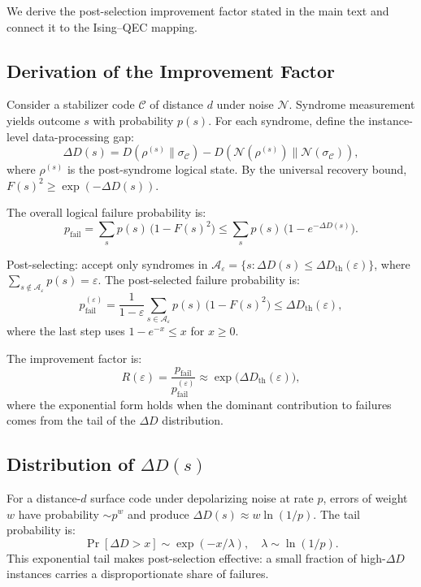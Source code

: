 \documentclass[prl,twocolumn,superscriptaddress,longbibliography]{revtex4-2}
\newcommand{\chan}{\mathcal{N}}
\newcommand{\code}{\mathcal{C}}
\begin{document}
We derive the post-selection improvement factor stated in the main text
and connect it to the Ising--QEC mapping.

\subsection{Derivation of the Improvement Factor}

Consider a stabilizer code $\code$ of distance $d$ under noise
$\chan$. Syndrome measurement yields outcome $s$ with probability
$p(s)$. For each syndrome, define the instance-level data-processing gap:
\begin{equation}
\Delta D(s) = D(\rho^{(s)}\|\sigma_\code)
  - D(\chan(\rho^{(s)})\|\chan(\sigma_\code)),
\end{equation}
where $\rho^{(s)}$ is the post-syndrome logical state. By the
universal recovery bound, $F(s)^2 \geq \exp(-\Delta D(s))$.

The overall logical failure probability is:
\begin{equation}
p_{\mathrm{fail}} = \sum_s p(s)\, \big(1 - F(s)^2\big)
\leq \sum_s p(s)\, \big(1 - e^{-\Delta D(s)}\big).
\end{equation}

Post-selecting: accept only syndromes in
$\mathcal{A}_\varepsilon = \{s : \Delta D(s) \leq
\Delta D_{\mathrm{th}}(\varepsilon)\}$,
where $\sum_{s \notin \mathcal{A}_\varepsilon} p(s) = \varepsilon$.
The post-selected failure probability is:
\begin{equation}
p_{\mathrm{fail}}^{(\varepsilon)}
= \frac{1}{1-\varepsilon}\sum_{s \in \mathcal{A}_\varepsilon} p(s)\,
  \big(1 - F(s)^2\big)
\leq \Delta D_{\mathrm{th}}(\varepsilon),
\end{equation}
where the last step uses $1 - e^{-x} \leq x$ for $x \geq 0$.

The improvement factor is:
\begin{equation}
R(\varepsilon) = \frac{p_{\mathrm{fail}}}{p_{\mathrm{fail}}^{(\varepsilon)}}
\approx \exp\!\big(\Delta D_{\mathrm{th}}(\varepsilon)\big),
\end{equation}
where the exponential form holds when the dominant contribution to
failures comes from the tail of the $\Delta D$ distribution.

\subsection{Distribution of $\Delta D(s)$}

For a distance-$d$ surface code under depolarizing noise at rate $p$,
errors of weight $w$ have probability $\sim p^w$ and produce
$\Delta D(s) \approx w \ln(1/p)$. The tail probability is:
\begin{equation}
\Pr[\Delta D > x] \sim \exp(-x/\lambda),
\quad \lambda \sim \ln(1/p).
\end{equation}
This exponential tail makes post-selection effective: a small fraction
of high-$\Delta D$ instances carries a disproportionate share of
failures.
\end{document}
